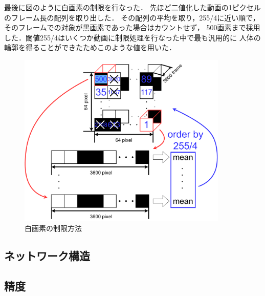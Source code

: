 最後に図\cite{choice}のように白画素の制限を行なった．
先ほど二値化した動画の1ピクセルのフレーム長の配列を取り出した．
その配列の平均を取り，255/4に近い順で，そのフレームでの対象が黒画素であった場合はカウントせず，
500画素まで採用した．閾値255/4はいくつか動画に制限処理を行なった中で最も汎用的に
人体の輪郭を得ることができたためこのような値を用いた．

\begin{figure}[b]
  \begin{center}
    \includegraphics[width=100mm]{images/choice.pdf}
  \end{center}
  \caption{白画素の制限方法}
  \label{choice}
\end{figure}

\clearpage

\subsection{ネットワーク構造}

\subsection{精度}